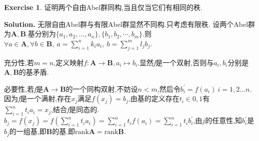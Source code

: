 \documentclass[a4paper]{book}
\newcommand{\rank}{\mathrm{rank}}
\newenvironment{solution}%
{\noindent\textbf{Solution.}}%
{\qedhere}
\numberwithin{equation}{chapter}
\theoremstyle{definition}
\newtheorem{exc}[exm]{Exercise}
\begin{document}
\begin{multicols}{2}
\begin{exc}
	证明两个自由Abel群同构,当且仅当它们有相同的秩.
\end{exc}

\begin{solution}
	无限自由Abel群与有限Abel群显然不同构.只考虑有限秩.
	设两个Abel群为$ \mathbf{A,B} $.基分别为$ \{a_1,a_2, \dots, a_n\}, \{b_1,b_2, \cdots , b_m\} $.则$ \forall a \in \mathbf{A},\forall b \in \mathbf{B},\ a = \sum_{i=1}^{n} k_i a_i,\ b = \sum_{j=1}^{m} l_j b_j $.
	
	充分性,若$ m = n $,定义映射$ f: \mathbf{A} \rightarrow \mathbf{B}, a_i \mapsto b_i $.显然\textit{f}是一个双射,否则与$ a_i, b_i $分别是$ \mathbf{A}, \mathbf{B} $的基矛盾.
	
	必要性,若\textit{f}是$ \mathbf{A} \rightarrow \mathbf{B} $的一个同构双射,不妨设$ n < m $,然后令$ b_i^\prime = f(a_i) \ i = 1,2 \dots n $.因为\textit{f}是一个满射,存在$ x_j $满足$ f(x_j) = b_{j} $,由基的定义存在$ t_i \in {0,1} $有$ \sum_{i = 1}^{n} t_i a_i = x_j $,结合\textit{f}是同态的.$ b_j = f(x_j) = f(\sum_{i=1}^{n} t_i a_i) = \sum_{i=1}^{n} t_i f(a_i) = \sum_{i = 1}^{n} t_i b_i^\prime $,由$ j $的任意性,知$ {b_i^\prime} $是$ {b_j} $的一组基,即$ \mathbf{B} $的基.即$ \rank \mathbf{A} = \rank \mathbf{B} $.
\end{solution}

%

%

%


\end{multicols}
\end{document}
